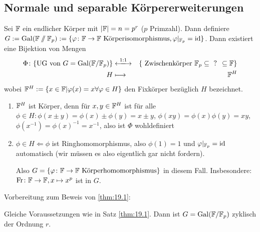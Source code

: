 \documentclass[12pt,a4paper]{scrartcl}
\begin{document}
\subsection{Normale und separable Körpererweiterungen}
\begin{satz}\label{thm:19.1} Sei $\mathbb F$ ein endlicher Körper mit $|\mathbb F| = n = p^r$ \textup($p$ Primzahl\textup). Dann definiere $G:= \operatorname{Gal}(\mathbb F\sslash\mathbb F_p):=\{\varphi\colon \mathbb F\to\mathbb F \text{ Körperisomorphismus}, \varphi|_{\mathbb F_p} = \operatorname{id} \}$. Dann existiert eine Bijektion von Mengen
\begin{eqnarray*}
\Phi\colon	\{\text{UG von  }G = \Gal(\IF/\IF_p)\} & \xlongleftrightarrow{1:1} &\{\text{ Zwischenkörper }\IF_p\subseteq \text{ ? }\subseteq \IF\}\\
	H &\longmapsto & \IF^H
\end{eqnarray*}
wobei $\mathbb F^H := \{x\in\mathbb F|\varphi(x) = x\forall \varphi\in H\}$ den Fixkörper bezüglich $H$ bezeichnet.
\end{satz}
\begin{bem}
	\leavevmode
	\begin{enumerate}
		\item $\mathbb F^H$ ist Körper, denn für $x,y\in\mathbb F^H$ ist für alle $\phi\in H: \phi(x\pm y) = \phi(x)\pm\phi(y) = x\pm y$, $\phi(xy) = \phi(x)\phi(y) = xy$, $\phi(x^{-1}) = \phi(x)^{-1} = x^{-1}$, also ist $\Phi$ wohldefiniert
		\item $\phi\in H\Leftarrow \phi$ ist Ringhomomorphismus, also $\phi(1) = 1$ und $\varphi|_{\mathbb F_p} = \operatorname{id}$ automatisch (wir müssen es also eigentlich gar nicht fordern).
		
		Also $G = \{\varphi\colon \mathbb F\to \mathbb F \text{ Körperhomomorphismus}\}$ in diesem Fall. Insbesondere: $\operatorname{Fr}\colon \mathbb F\to\mathbb F, x\mapsto x^p$ ist in $G$.
	\end{enumerate}
\end{bem}
Vorbereitung zum Beweis von \ref{thm:19.1}:
\begin{lem}
	Gleiche Voraussetzungen wie in Satz \ref{thm:19.1}. Dann ist $G = \operatorname{Gal}(\mathbb F/\mathbb F_p)$ zyklisch der Ordnung $r$.
\end{lem}
\end{document}
